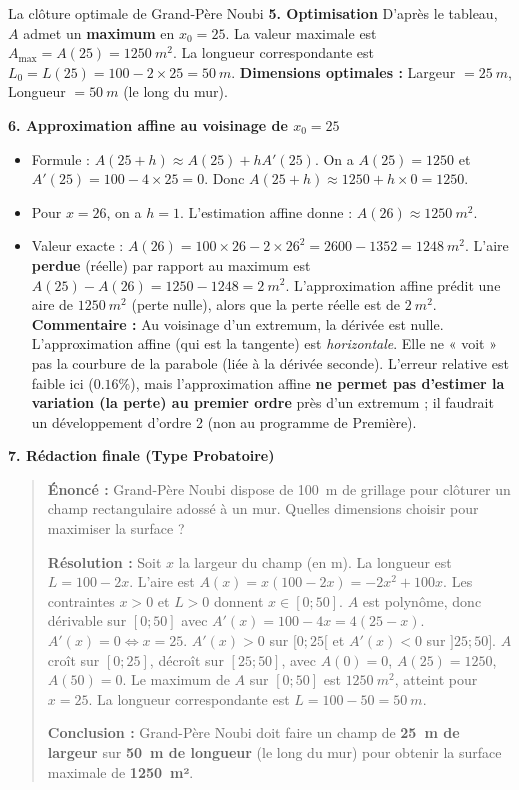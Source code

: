 \documentclass[11pt]{article}
\begin{document}
\begin{exoresolu}{La clôture optimale de Grand-Père Noubi}
\textbf{5. Optimisation}
D'après le tableau, $A$ admet un \textbf{maximum} en $x_0 = 25$.
La valeur maximale est $A_{\max} = A(25) = \SI{1250}{m^2}$.
La longueur correspondante est $L_0 = L(25) = 100 - 2 \times 25 = \SI{50}{m}$.
\textbf{Dimensions optimales :} Largeur $= \SI{25}{m}$, Longueur $= \SI{50}{m}$ (le long du mur).

\textbf{6. Approximation affine au voisinage de $x_0 = 25$}
\begin{itemize}
    \item[a)] Formule : $A(25+h) \approx A(25) + h A'(25)$.
    On a $A(25) = 1250$ et $A'(25) = 100 - 4 \times 25 = 0$.
    Donc $A(25+h) \approx 1250 + h \times 0 = 1250$.
    \item[b)] Pour $x = 26$, on a $h = 1$. L'estimation affine donne : $A(26) \approx \SI{1250}{m^2}$.
    \item[c)] Valeur exacte : $A(26) = 100 \times 26 - 2 \times 26^2 = 2600 - 1352 = \SI{1248}{m^2}$.
    L'aire \textbf{perdue} (réelle) par rapport au maximum est $A(25) - A(26) = 1250 - 1248 = \SI{2}{m^2}$.
    L'approximation affine prédit une aire de $\SI{1250}{m^2}$ (perte nulle), alors que la perte réelle est de $\SI{2}{m^2}$.
    \textbf{Commentaire :} Au voisinage d'un extremum, la dérivée est nulle. L'approximation affine (qui est la tangente) est \emph{horizontale}. Elle ne « voit » pas la courbure de la parabole (liée à la dérivée seconde). L'erreur relative est faible ici ($\num{0,16}\%$), mais l'approximation affine \textbf{ne permet pas d'estimer la variation (la perte) au premier ordre} près d'un extremum ; il faudrait un développement d'ordre 2 (non au programme de Première).
\end{itemize}

\textbf{7. Rédaction finale (Type Probatoire)}
\begin{quote}
\textbf{Énoncé :} Grand-Père Noubi dispose de \SI{100}{m} de grillage pour clôturer un champ rectangulaire adossé à un mur. Quelles dimensions choisir pour maximiser la surface ?

\textbf{Résolution :}
Soit $x$ la largeur du champ (en m). La longueur est $L = 100 - 2x$.
L'aire est $A(x) = x(100-2x) = -2x^2 + 100x$.
Les contraintes $x>0$ et $L>0$ donnent $x \in [0; 50]$.
$A$ est polynôme, donc dérivable sur $[0; 50]$ avec $A'(x) = 100 - 4x = 4(25-x)$.
$A'(x) = 0 \iff x = 25$.
$A'(x) > 0$ sur $[0; 25[$ et $A'(x) < 0$ sur $]25; 50]$.
$A$ croît sur $[0; 25]$, décroît sur $[25; 50]$, avec $A(0)=0$, $A(25)=1250$, $A(50)=0$.
Le maximum de $A$ sur $[0; 50]$ est $\SI{1250}{m^2}$, atteint pour $x=25$.
La longueur correspondante est $L = 100 - 50 = \SI{50}{m}$.

\textbf{Conclusion :} Grand-Père Noubi doit faire un champ de \textbf{\SI{25}{m} de largeur} sur \textbf{\SI{50}{m} de longueur} (le long du mur) pour obtenir la surface maximale de \textbf{\SI{1250}{m²}}.
\end{quote}
\end{exoresolu}
\end{document}
